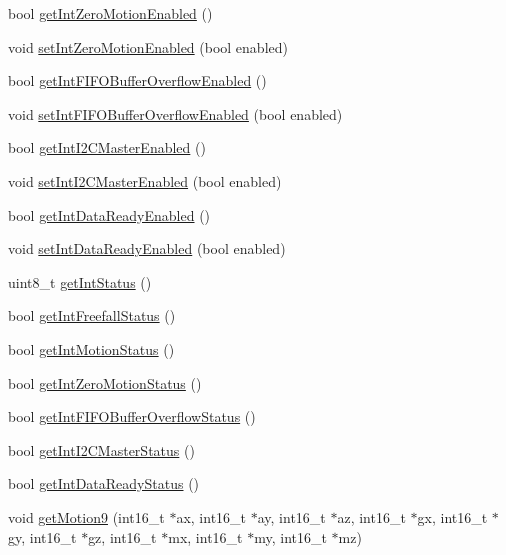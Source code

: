 \begin{DoxyCompactItemize}
\item 
bool \mbox{\hyperlink{class_m_p_u6050_ab3cc9bcaca6cec61e7f3f0c6c8a37db5}{get\+Int\+Zero\+Motion\+Enabled}} ()
\item 
void \mbox{\hyperlink{class_m_p_u6050_a5e36e3acace6e545718d7997169cff9b}{set\+Int\+Zero\+Motion\+Enabled}} (bool enabled)
\item 
bool \mbox{\hyperlink{class_m_p_u6050_a55f99c88cc84901f245924ed5e3fe47e}{get\+Int\+F\+I\+F\+O\+Buffer\+Overflow\+Enabled}} ()
\item 
void \mbox{\hyperlink{class_m_p_u6050_a83710a6b1e07f3b385239cc06f275cdb}{set\+Int\+F\+I\+F\+O\+Buffer\+Overflow\+Enabled}} (bool enabled)
\item 
bool \mbox{\hyperlink{class_m_p_u6050_a282ae29e029d88604a59c92bdf9ce252}{get\+Int\+I2\+C\+Master\+Enabled}} ()
\item 
void \mbox{\hyperlink{class_m_p_u6050_af238656844a3727fa96a8d434b55473e}{set\+Int\+I2\+C\+Master\+Enabled}} (bool enabled)
\item 
bool \mbox{\hyperlink{class_m_p_u6050_ae15f6043a74c9c9bf9754824802ce8d3}{get\+Int\+Data\+Ready\+Enabled}} ()
\item 
void \mbox{\hyperlink{class_m_p_u6050_a67a11be7fc7ab6b1186469b94ea33dda}{set\+Int\+Data\+Ready\+Enabled}} (bool enabled)
\item 
uint8\+\_\+t \mbox{\hyperlink{class_m_p_u6050_a550a735623cb1de950c72cd6931ee804}{get\+Int\+Status}} ()
\item 
bool \mbox{\hyperlink{class_m_p_u6050_a06bbc2116235b7cc5e28c877e0576749}{get\+Int\+Freefall\+Status}} ()
\item 
bool \mbox{\hyperlink{class_m_p_u6050_ac0c0836aa0d237cac92d11591efd0d9f}{get\+Int\+Motion\+Status}} ()
\item 
bool \mbox{\hyperlink{class_m_p_u6050_afa73a5ffdc423736ae88702a469ba3a0}{get\+Int\+Zero\+Motion\+Status}} ()
\item 
bool \mbox{\hyperlink{class_m_p_u6050_aa31427588f059c69d93ddb00ba257b12}{get\+Int\+F\+I\+F\+O\+Buffer\+Overflow\+Status}} ()
\item 
bool \mbox{\hyperlink{class_m_p_u6050_a31d6c2b03fc2d6ce82d67d142f316851}{get\+Int\+I2\+C\+Master\+Status}} ()
\item 
bool \mbox{\hyperlink{class_m_p_u6050_ae4f434eb51a15b536e2e8f89a776872b}{get\+Int\+Data\+Ready\+Status}} ()
\item 
void \mbox{\hyperlink{class_m_p_u6050_aabfd2920e748016383e8124a4b32ad31}{get\+Motion9}} (int16\+\_\+t $\ast$ax, int16\+\_\+t $\ast$ay, int16\+\_\+t $\ast$az, int16\+\_\+t $\ast$gx, int16\+\_\+t $\ast$gy, int16\+\_\+t $\ast$gz, int16\+\_\+t $\ast$mx, int16\+\_\+t $\ast$my, int16\+\_\+t $\ast$mz)

\end{DoxyCompactItemize}
